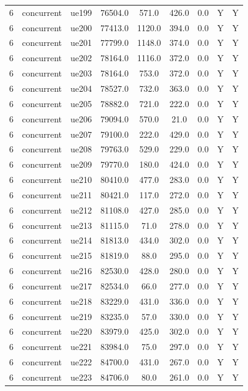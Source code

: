 \begin{table}[ht]
\begin{tabular}{|c|c|c|c|c|c|c|c|c|}
6 & concurrent & ue199 & 76504.0 & 571.0 & 426.0 & 0.0 & Y & Y \\
6 & concurrent & ue200 & 77413.0 & 1120.0 & 394.0 & 0.0 & Y & Y \\
6 & concurrent & ue201 & 77799.0 & 1148.0 & 374.0 & 0.0 & Y & Y \\
6 & concurrent & ue202 & 78164.0 & 1116.0 & 372.0 & 0.0 & Y & Y \\
6 & concurrent & ue203 & 78164.0 & 753.0 & 372.0 & 0.0 & Y & Y \\
6 & concurrent & ue204 & 78527.0 & 732.0 & 363.0 & 0.0 & Y & Y \\
6 & concurrent & ue205 & 78882.0 & 721.0 & 222.0 & 0.0 & Y & Y \\
6 & concurrent & ue206 & 79094.0 & 570.0 & 21.0 & 0.0 & Y & Y \\
6 & concurrent & ue207 & 79100.0 & 222.0 & 429.0 & 0.0 & Y & Y \\
6 & concurrent & ue208 & 79763.0 & 529.0 & 229.0 & 0.0 & Y & Y \\
6 & concurrent & ue209 & 79770.0 & 180.0 & 424.0 & 0.0 & Y & Y \\
6 & concurrent & ue210 & 80410.0 & 477.0 & 283.0 & 0.0 & Y & Y \\
6 & concurrent & ue211 & 80421.0 & 117.0 & 272.0 & 0.0 & Y & Y \\
6 & concurrent & ue212 & 81108.0 & 427.0 & 285.0 & 0.0 & Y & Y \\
6 & concurrent & ue213 & 81115.0 & 71.0 & 278.0 & 0.0 & Y & Y \\
6 & concurrent & ue214 & 81813.0 & 434.0 & 302.0 & 0.0 & Y & Y \\
6 & concurrent & ue215 & 81819.0 & 88.0 & 295.0 & 0.0 & Y & Y \\
6 & concurrent & ue216 & 82530.0 & 428.0 & 280.0 & 0.0 & Y & Y \\
6 & concurrent & ue217 & 82534.0 & 66.0 & 277.0 & 0.0 & Y & Y \\
6 & concurrent & ue218 & 83229.0 & 431.0 & 336.0 & 0.0 & Y & Y \\
6 & concurrent & ue219 & 83235.0 & 57.0 & 330.0 & 0.0 & Y & Y \\
6 & concurrent & ue220 & 83979.0 & 425.0 & 302.0 & 0.0 & Y & Y \\
6 & concurrent & ue221 & 83984.0 & 75.0 & 297.0 & 0.0 & Y & Y \\
6 & concurrent & ue222 & 84700.0 & 431.0 & 267.0 & 0.0 & Y & Y \\
6 & concurrent & ue223 & 84706.0 & 80.0 & 261.0 & 0.0 & Y & Y \\

\end{tabular}
\end{table}
